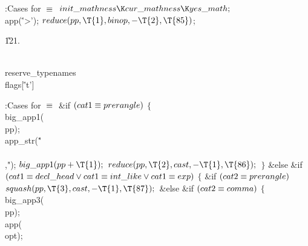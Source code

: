 \B{}:Cases for \X${}\equiv{}$\6
$\\{init\_mathness}\K\\{cur\_mathness}\K\\{yes\_math};{}$\6
\\{app}(\.{'>'});\6
${}\\{reduce}(\\{pp},\39\T{1},\39\\{binop},\39{-}\T{2},\39\T{85}){}$;\par
\U121.\fi

\B\D\\{reserve\_typenames}\5
\\{flags}[\.{'t'}]\par
\Y\B\4:Cases for \X${}\equiv{}$\6
\&{if} ${}(\\{cat1}\equiv\\{prerangle}){}$\5
${}\{{}$\1\6
\\{big\_app1}(\\{pp});\6
\\{app\_str}(\.{"\\\\,"});\6
${}\\{big\_app1}(\\{pp}+\T{1});{}$\6
${}\\{reduce}(\\{pp},\39\T{2},\39\\{cast},\39{-}\T{1},\39\T{86});{}$\6
\4${}\}{}$\2\6
\&{else} \&{if} ${}(\\{cat1}\E\\{decl\_head}\V\\{cat1}\E\\{int\_like}\V\\{cat1}%
\E\\{exp}){}$\5
${}\{{}$\1\6
\&{if} ${}(\\{cat2}\equiv\\{prerangle}){}$\1\5
${}\\{squash}(\\{pp},\39\T{3},\39\\{cast},\39{-}\T{1},\39\T{87});{}$\2\6
\&{else} \&{if} ${}(\\{cat2}\equiv\\{comma}){}$\5
${}\{{}$\1\6
\\{big\_app3}(\\{pp});\6
\\{app}(\\{opt});\6
